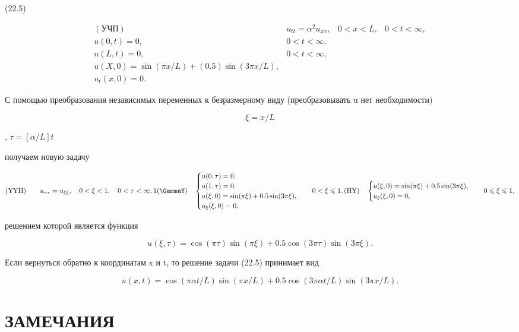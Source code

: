 \documentclass[
  ukrainian,
]{article}
\begin{document}
(22.5)

\[
\begin{aligned} (\text{УЧП}) & u_{tt} = \alpha^2 u_{xx}, & 0 < x < L, & 0 < t < \infty, \\ u(0, t) = 0, & 0 < t < \infty, \\ u(L, t) = 0, & 0 < t < \infty, \\ u(X, 0) = \sin(\pi x/L) + (0.5)\sin(3\pi x/L), \\ u_t(x, 0) = 0. & \end{aligned}
\]

С помощью преобразования независимых переменных к безразмерному виду
(преобразовывать u нет необходимости)

\[
\xi = x/L
\]

, \(\tau = [\alpha/L] t\)

получаем новую задачу

\[
(\text{YYII}) \qquad u_{\tau\tau} = u_{\xi\xi}, \quad 0 < \xi < 1, \quad 0 < \tau < \infty, 1
(\text{\GammaY}) \quad
\begin{cases} u(0, \tau) = 0, \\ u(1, \tau) = 0, \\ u(\xi, 0) = \sin(\pi\xi) + 0.5\sin(3\pi\xi), \\ u_{\xi}(\xi, 0) = 0, \end{cases}
\quad 0 < \xi \leqslant 1,
(\text{HY}) \quad
\begin{cases} u(\xi, 0) = \sin(\pi\xi) + 0.5\sin(3\pi\xi), \\ u_{\xi}(\xi, 0) = 0, \end{cases}
\quad 0 \leqslant \xi \leqslant 1,
\]

решением которой является функция

\[
u(\xi, \tau) = \cos(\pi \tau) \sin(\pi \xi) + 0.5 \cos(3\pi \tau) \sin(3\pi \xi).
\]

Если вернуться обратно к координатам x и t, то решение задачи (22.5)
принимает вид

\[
u(x, t) = \cos(\pi \alpha t/L)\sin(\pi x/L) + 0.5\cos(3\pi \alpha t/L)\sin(3\pi x/L).
\]

\section{ЗАМЕЧАНИЯ}\label{ux437ux430ux43cux435ux447ux430ux43dux438ux44f-8}
\end{document}
